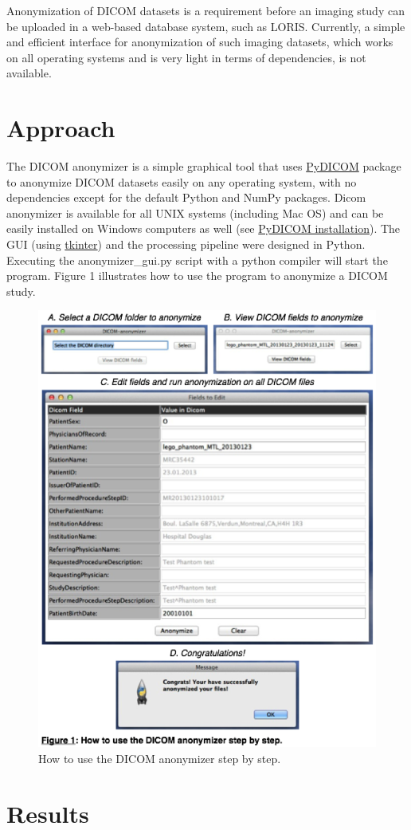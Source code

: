 \documentclass[twocolumn]{bmcart}%
\begin{document}
Anonymization of DICOM datasets is a requirement before an imaging study
can be uploaded in a web-based database system, such as
LORIS\cite{Das2011}. Currently, a simple and efficient interface for
anonymization of such imaging datasets, which works on all operating
systems and is very light in terms of dependencies, is not available.

\section{Approach}\label{approach}

The DICOM anonymizer is a simple graphical tool that uses
\href{https://github.com/darcymason/pydicom}{PyDICOM} package to
anonymize DICOM datasets easily on any operating system, with no
dependencies except for the default Python and NumPy packages. Dicom
anonymizer is available for all UNIX systems (including Mac OS) and can
be easily installed on Windows computers as well (see
\href{http://pydicom.readthedocs.org/en/latest/getting_started.html}{PyDICOM
installation}). The GUI (using
\href{https://wiki.python.org/moin/TkInter}{tkinter}) and the processing
pipeline were designed in Python. Executing the anonymizer\_gui.py
script with a python compiler will start the program. Figure 1
illustrates how to use the program to anonymize a DICOM study.

\begin{figure}[h!]
  \includegraphics[width=.47\textwidth]{loris_screenshot.png}
  \caption{\label{centfig} How to use the DICOM anonymizer step by step.}
\end{figure}

\section{Results}\label{results}
\end{document}
